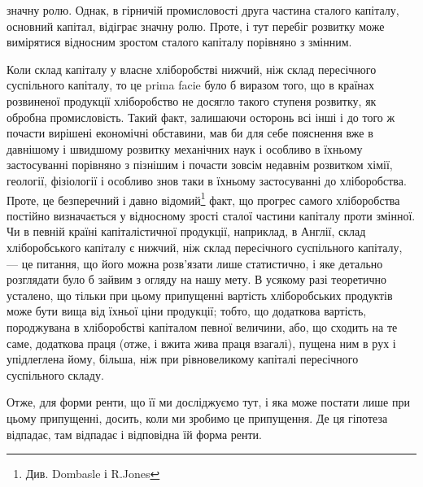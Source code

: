 \parcont{}  %
значну ролю. Однак, в гірничій промисловості друга частина сталого капіталу, основний капітал,
відіграє значну ролю. Проте, і тут перебіг розвитку може вимірятися відносним зростом сталого
капіталу порівняно з змінним.

Коли склад капіталу у власне хліборобстві нижчий, ніж склад пересічного
суспільного капіталу, то це prima facie було б виразом того, що в країнах
розвиненої продукції хліборобство не досягло такого ступеня розвитку, як обробна промисловість.
Такий факт, залишаючи осторонь всі інші і до того ж почасти вирішені економічні обставини, мав би
для себе пояснення вже в давнішому і швидшому розвитку механічних наук і особливо в їхньому
застосуванні порівняно з пізнішим і почасти зовсім недавнім розвитком хімії, геології, фізіології і
особливо знов таки в їхньому застосуванні до хліборобства. Проте, це безперечний і давно відомий\footnote{Див. Dombasle і R.Jones}
факт, що прогрес самого хліборобства постійно визначається у відносному зрості сталої частини
капіталу проти змінної. Чи в певній країні капіталістичної продукції, наприклад, в Англії, склад
хліборобського капіталу є нижчий, ніж склад пересічного суспільного капіталу, — це питання, що його
можна розв’язати лише статистично, і яке детально розглядати було б зайвим з огляду на нашу мету. В
усякому разі теоретично усталено, що тільки при цьому припущенні вартість хліборобських продуктів
може бути вища від їхньої ціни продукції; тобто, що додаткова вартість, породжувана в хліборобстві
капіталом певної величини, або, що сходить на те саме, додаткова праця (отже, і вжита жива праця
взагалі), пущена ним в рух і упідлеглена йому, більша, ніж при рівновеликому капіталі пересічного
суспільного складу.

Отже, для форми ренти, що її ми досліджуємо тут, і яка може постати лише
при цьому припущенні, досить, коли ми зробимо це припущення. Де ця гіпотеза
відпадає, там відпадає і відповідна їй форма ренти.

